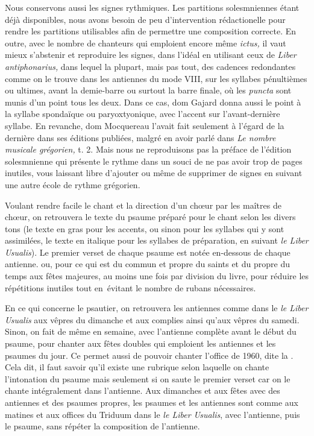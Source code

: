 \begin{frpars}

Nous conservons aussi les signes rythmiques. Les partitions solesmniennes étant déjà disponibles, nous avons besoin de peu d'intervention rédactionelle pour rendre les partitions utilisables afin de permettre une composition correcte. En outre, avec le nombre de chanteurs qui emploient encore même \textit{ictus,} il vaut mieux s'abstenir et reproduire les signes, dans l'idéal en utilisant ceux de \textit{Liber antiphonarius,} dans lequel la plupart, mais pas tout, des cadences redondantes comme on le trouve dans les antiennes du mode VIII, sur les syllabes pénultièmes ou ultimes, avant la demie-barre ou surtout la barre finale, où les \textit{puncta} sont munis d'un point tous les deux. Dans ce cas, dom Gajard donna aussi le point à la syllabe spondaïque ou paryoxtyonique, avec l'accent sur l'avant-dernière syllabe. En revanche, dom Mocquereau l'avait fait seulement à l'égard de la dernière dans ses éditions publiées, malgré en avoir parlé dans \textit{Le nombre musicale grégorien,} t. 2. Mais nous ne reproduisons pas la préface de l'édition solesmnienne qui présente le rythme dans un souci de ne pas avoir trop de pages inutiles, vous laissant libre d'ajouter ou même de supprimer de signes en suivant une autre école de rythme grégorien.

Voulant rendre facile le chant et la direction d'un chœur par les maîtres de chœur, on retrouvera le texte du psaume préparé pour le chant selon les divers tons (le texte en gras pour les accents, ou sinon pour les syllabes qui y sont assimilées, le texte en italique pour les syllabes de préparation, en suivant \textit{le Liber Usualis}). Le premier verset de chaque psaume est notée en-dessous de chaque antienne. ou, pour ce qui est du commun et propre du saints et du propre du temps aux fêtes majeures, au moins une fois par division du livre, pour réduire les répétitions inutiles tout en évitant le nombre de rubans nécessaires.

En ce qui concerne le psautier, on retrouvera les antiennes comme dans le \textit{le Liber Usualis} aux vêpres du dimanche et aux complies ainsi qu'aux vêpres du samedi. Sinon, on fait de même en semaine, avec l'antienne complète avant le début du psaume, pour chanter aux fêtes doubles qui emploient les antiennes et les psaumes du jour. Ce permet aussi de pouvoir chanter l'office de 1960, dite la . Cela dit, il faut savoir qu'il existe une rubrique selon laquelle on chante l'intonation du psaume mais seulement si on saute le premier verset car on le chante intégralement dans l'antienne. Aux dimanches et aux fêtes avec des antiennes et des psaumes propres, les psaumes et les antiennes sont comme aux matines et aux offices du Triduum dans le \textit{le Liber Usualis}, avec l'antienne, puis le psaume, sans répéter la composition de l'antienne.


\end{frpars}
